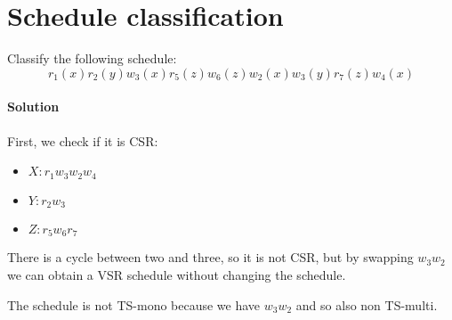 \section{Schedule classification}

Classify the following schedule:
\[r_1(x) r_2(y) w_3(x) r_5(z) w_6(z) w_2(x) w_3(y) r_7(z) w_4(x)\] 

\paragraph*{Solution}
First, we check if it is CSR:
\begin{itemize}
    \item $X: r_1 w_3 w_2 w_4$
    \item $Y: r_2 w_3$
    \item $Z: r_5 w_6 r_7$
\end{itemize}
There is a cycle between two and three, so it is not CSR, but by swapping $w_3 w_2$ we can obtain a VSR schedule without changing the schedule. 

The schedule is not TS-mono because we have $w_3 w_2$ and so also non TS-multi. 